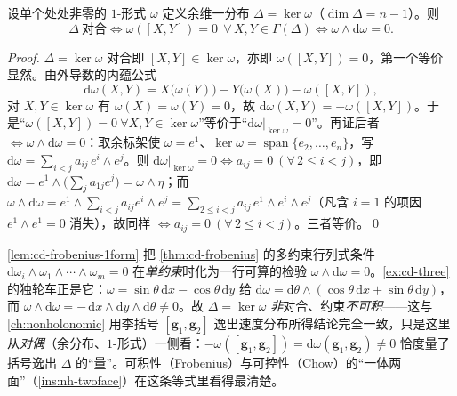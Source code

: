 \begin{lemma}[余维一情形：一行可算的微分形式判据 $\omega\wedge\mathrm d\omega=0$]\label{lem:cd-frobenius-1form}
设单个处处非零的 $1$-形式 $\omega$ 定义余维一分布 $\Delta=\ker\omega$（$\dim\Delta=n-1$）。则
\[
  \Delta\ \text{对合}\iff \omega([X,Y])=0\ \ \forall\,X,Y\in\Gamma(\Delta)\iff \omega\wedge\mathrm d\omega=0 .
\]
\end{lemma}
\begin{proof}
$\Delta=\ker\omega$ 对合即 $[X,Y]\in\ker\omega$，亦即 $\omega([X,Y])=0$，第一个等价显然。由外导数的内蕴公式
\[
  \mathrm d\omega(X,Y)=X\big(\omega(Y)\big)-Y\big(\omega(X)\big)-\omega([X,Y]),
\]
对 $X,Y\in\ker\omega$ 有 $\omega(X)=\omega(Y)=0$，故 $\mathrm d\omega(X,Y)=-\omega([X,Y])$。于是“$\omega([X,Y])=0\ \forall X,Y\in\ker\omega$”等价于“$\mathrm d\omega|_{\ker\omega}=0$”。再证后者 $\iff\omega\wedge\mathrm d\omega=0$：取余标架使 $\omega=e^1$、$\ker\omega=\operatorname{span}\{e_2,\dots,e_n\}$，写 $\mathrm d\omega=\sum_{i<j}a_{ij}\,e^i\wedge e^j$。则 $\mathrm d\omega|_{\ker\omega}=0\iff a_{ij}=0\ (\forall\,2\le i<j)$，即 $\mathrm d\omega=e^1\wedge\big(\textstyle\sum_j a_{1j}e^j\big)=\omega\wedge\eta$；而 $\omega\wedge\mathrm d\omega=e^1\wedge\sum_{i<j}a_{ij}e^i\wedge e^j=\sum_{2\le i<j}a_{ij}\,e^1\wedge e^i\wedge e^j$（凡含 $i=1$ 的项因 $e^1\wedge e^1=0$ 消失），故同样 $\iff a_{ij}=0\ (\forall\,2\le i<j)$。三者等价。\qed
\end{proof}

\begin{insight}\label{ins:cd-frobenius-unicycle}
\cref{lem:cd-frobenius-1form} 把 \cref{thm:cd-frobenius} 的多约束行列式条件 $\mathrm d\omega_i\wedge\omega_1\wedge\cdots\wedge\omega_m=0$ 在\emph{单约束}时化为一行可算的检验 $\omega\wedge\mathrm d\omega=0$。\cref{ex:cd-three} 的独轮车正是它：$\omega=\sin\theta\,\mathrm dx-\cos\theta\,\mathrm dy$ 给 $\mathrm d\omega=\mathrm d\theta\wedge(\cos\theta\,\mathrm dx+\sin\theta\,\mathrm dy)$，而 $\omega\wedge\mathrm d\omega=-\,\mathrm dx\wedge\mathrm dy\wedge\mathrm d\theta\neq0$。故 $\Delta=\ker\omega$ \emph{非}对合、约束\emph{不可积}——这与 \cref{ch:nonholonomic} 用李括号 $[\mathbf g_1,\mathbf g_2]$ 逸出速度分布所得结论完全一致，只是这里从\emph{对偶}（余分布、$1$-形式）一侧看：$-\omega([\mathbf g_1,\mathbf g_2])=\mathrm d\omega(\mathbf g_1,\mathbf g_2)\neq0$ 恰度量了括号逸出 $\Delta$ 的“量”。可积性（Frobenius）与可控性（Chow）的“一体两面”（\cref{ins:nh-twoface}）在这条等式里看得最清楚。
\end{insight}

